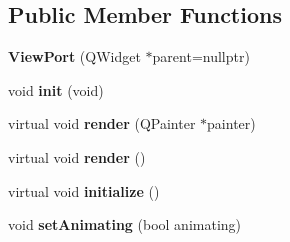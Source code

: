 \subsection*{Public Member Functions}
\begin{DoxyCompactItemize}
\item 
\mbox{\label{classmgs_1_1render_1_1ViewPort_a2ed0dbb0dbb978a96a0777a41d734d6b}} 
{\bfseries View\+Port} (Q\+Widget $\ast$parent=nullptr)
\item 
\mbox{\label{classmgs_1_1render_1_1ViewPort_a0cec33a1673d98d565249a55524f9e16}} 
void {\bfseries init} (void)
\item 
\mbox{\label{classmgs_1_1render_1_1ViewPort_af7f612a71f920c37f93b8f16f6aa556b}} 
virtual void {\bfseries render} (Q\+Painter $\ast$painter)
\item 
\mbox{\label{classmgs_1_1render_1_1ViewPort_ab319823d7cc6b6be4281758f4f4801de}} 
virtual void {\bfseries render} ()
\item 
\mbox{\label{classmgs_1_1render_1_1ViewPort_a4d150f597d41f6911a67076c756de6b6}} 
virtual void {\bfseries initialize} ()
\item 
\mbox{\label{classmgs_1_1render_1_1ViewPort_a27383a1a777d25056f127fd378e17d15}} 
void {\bfseries set\+Animating} (bool animating)
\end{DoxyCompactItemize}

